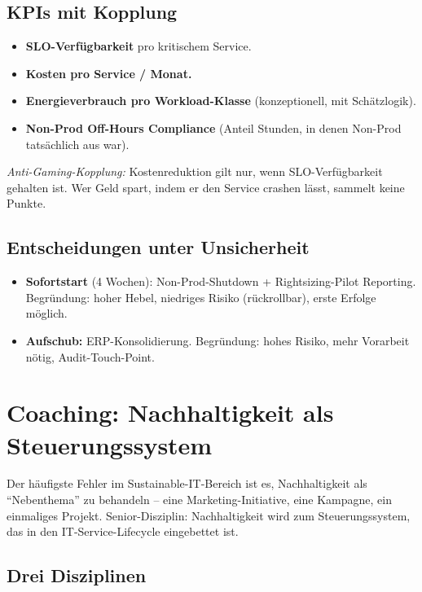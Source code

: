 \documentclass[11pt,a4paper,oneside]{article}
\begin{document}
\subsection{KPIs mit Kopplung}

\begin{itemize}
  \item \textbf{SLO-Verfügbarkeit} pro kritischem Service.
  \item \textbf{Kosten pro Service / Monat.}
  \item \textbf{Energieverbrauch pro Workload-Klasse} (konzeptionell, mit Schätzlogik).
  \item \textbf{Non-Prod Off-Hours Compliance} (Anteil Stunden, in denen Non-Prod tatsächlich aus war).
\end{itemize}

\emph{Anti-Gaming-Kopplung:} Kostenreduktion gilt nur, wenn SLO-Verfügbarkeit gehalten ist. Wer Geld spart, indem er den Service crashen lässt, sammelt keine Punkte.

\subsection{Entscheidungen unter Unsicherheit}

\begin{itemize}
  \item \textbf{Sofortstart} (4 Wochen): Non-Prod-Shutdown + Rightsizing-Pilot Reporting. Begründung: hoher Hebel, niedriges Risiko (rückrollbar), erste Erfolge möglich.
  \item \textbf{Aufschub:} ERP-Konsolidierung. Begründung: hohes Risiko, mehr Vorarbeit nötig, Audit-Touch-Point.
\end{itemize}

\section{Coaching: Nachhaltigkeit als Steuerungssystem}

Der häufigste Fehler im Sustainable-IT-Bereich ist es, Nachhaltigkeit als ``Nebenthema'' zu behandeln -- eine Marketing-Initiative, eine Kampagne, ein einmaliges Projekt. Senior-Disziplin: Nachhaltigkeit wird zum Steuerungssystem, das in den IT-Service-Lifecycle eingebettet ist.

\subsection{Drei Disziplinen}
\end{document}
